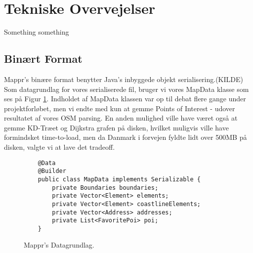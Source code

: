 \section{Tekniske Overvejelser}
Something something

\subsection{Binært Format}
Mappr's binære format benytter Java's inbyggede objekt serialisering.(KILDE)
Som datagrundlag for vores serialiserede fil, bruger vi vores MapData klasse som ses på Figur \ref{fig:mapdata}. Indholdet af MapData klassen var op til debat flere gange under projektforløbet, men vi endte med kun at gemme Points of Interest - udover resultatet af vores OSM parsing.
En anden mulighed ville have været også at gemme KD-Træet og Dijkstra grafen på disken, hvilket muligvis ville have formindsket time-to-load, men da Danmark i forvejen fyldte lidt over 500MB på disken, valgte vi at lave det tradeoff.


\begin{figure}[t!]
    \begin{lstlisting}
	@Data
	@Builder
	public class MapData implements Serializable {
		private Boundaries boundaries;
		private Vector<Element> elements;
		private Vector<Element> coastlineElements;
		private Vector<Address> addresses;
		private List<FavoritePoi> poi;
	}
    \end{lstlisting}
    \caption{Mappr's Datagrundlag.}
    \label{fig:mapdata}
\end{figure}